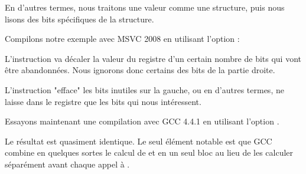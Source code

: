 En d'autres termes, nous traitons une valeur \Tint comme une structure, puis nous lisons des bits spécifiques 
de la structure.


Compilons notre exemple avec MSVC 2008 en utilisant l'option \Ox:




L'instruction  va décaler la valeur du registre \EAX d'un certain nombre de bits qui vont être 
abandonnées. Nous ignorons donc certains des bits de la partie droite.


L'instruction \AND "efface" les bits inutiles sur la gauche, ou en d'autres termes, ne laisse dans le 
registre \EAX que les bits qui nous intéressent.




Essayons maintenant une compilation avec GCC 4.4.1 en utilisant l'option \Othree.



Le résultat est quasiment identique.
Le seul élément notable est que GCC combine en quelques sortes le calcul de  et 
 en un seul bloc au lieu de les calculer séparément avant chaque appel à \printf.
